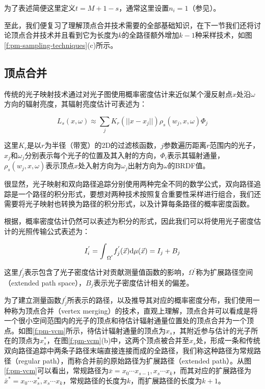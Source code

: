 \noindent 为了表述简便这里定义$t=M+1-s$，通常这里设置$n_i=1$（参见\cite{a:OptimallyCombiningSamplingTechniquesforMonteCarloRendering}）。

至此，我们便复习了理解顶点合并技术需要的全部基础知识，在下一节我们还将讨论顶点合并技术并且看到它为长度为$k$的全路径额外增加$k-1$种采样技术，如图\ref{f:pm-sampling-techniques}(c)所示。





\subsection{顶点合并}
传统的光子映射技术通过对光子图使用概率密度估计来近似某个漫反射点$x$处沿$\omega$方向的辐射亮度，其辐射亮度估计可表述为\cite{a:GlobalIlluminationusingPhotonMaps}：

\begin{equation}
	L_s(x,\omega)\approx\sum_{j}K_r(||x-x_j||)\rho_s(w_j,x,\omega)\Phi_j
\end{equation}

\noindent 这里$K_r$是以$r$为半径（带宽）的2D的过滤核函数，$j$参数遍历距离$r$范围内的光子，$x_{j}$和$\omega_j$分别表示每个光子的位置及其入射的方向，$\Phi_i$表示其辐射通量，$\rho_s(w_j,x,\omega)$表示顶点$x$处入射方向为$\omega_j$出射方向为$\omega$的BRDF值。

很显然，光子映射和双向路径追踪分别使用两种完全不同的数学公式，双向路径追踪是一个路径的积分形式，要想对两种技术按照复合重要性采样进行组合，我们还需要将光子映射也转换为路径的积分形式，以及计算每条路径的概率密度函数。

根据\cite{a:Densityestimationforstatisticsanddataanalysis}，概率密度估计仍然可以表述为积分的形式，因此我们可以将使用光子密度估计的光照传输公式表述为：

\begin{equation}
	I^{'}_i={\rm \int}_{\Omega^{'}}f^{'}_j(\vec{x}){\rm d}\mu(\vec{x})=I_j+B_j
\end{equation}

\noindent 这里$f^{'}_j$表示包含了光子密度估计对贡献测量值函数的影响，$\Omega^{'}$称为扩展路径空间（extended path space），$B_j$表示光子密度估计相关的偏差。

为了建立测量函数$f^{'}_j$所表示的路径，以及推导其对应的概率密度分布，我们使用一种称为顶点合并（vertex merging）的技术，直观上理解，顶点合并可以看成是将一个很小空间范围内的光子的顶点和待估计辐射通量位置处的顶点合并为一个顶点。如图\ref{f:pm-vcm}所示，待估计辐射通量的顶点为$x_s$，其附近参与估计的光子所在的顶点为$x^{*}_{s}$，在图\ref{f:pm-vcm}(b)中，这两个顶点被合并至$x_s$处，形成一条和传统双向路径追踪中两条子路径末端直接连接而成的全路径，我们称这种路径为常规路径（regular path），而称合并前的原始路径为扩展路径（extended path）。从图\ref{f:pm-vcm}可以看出，常规路径为$\bar{x}=x_0\cdots x_{s-1},x_s\cdots x_k$，而其对应的扩展路径为$\bar{x}^{*}=x_0\cdots x^{*}_{s},x_s\cdots x_k$，常规路径的长度为$k$，而扩展路径的长度为$k+1$。

